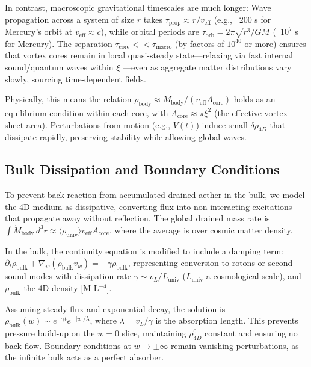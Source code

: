 \documentclass{article}
\begin{document}
In contrast, macroscopic gravitational timescales are much longer: Wave propagation across a system of size $r$ takes $\tau_{\text{prop}} \approx r / v_{\text{eff}}$ (e.g., ~200 s for Mercury's orbit at $v_{\text{eff}} \approx c$), while orbital periods are $\tau_{\text{orb}} = 2\pi \sqrt{r^3 / G M}$ (~$10^{7}$ s for Mercury). The separation $\tau_{\text{core}} << \tau_{\text{macro}}$ (by factors of $10^{40}$ or more) ensures that vortex cores remain in local quasi-steady state---relaxing via fast internal sound/quantum waves within $\xi$ ---even as aggregate matter distributions vary slowly, sourcing time-dependent fields.

Physically, this means the relation $\rho_{\text{body}} \approx \dot{M}_{\text{body}} / (v_{\text{eff}} A_{\text{core}})$ holds as an equilibrium condition within each core, with $A_{\text{core}} \approx \pi \xi^2$ (the effective vortex sheet area). Perturbations from motion (e.g., $V(t)$) induce small $\delta \rho_{4D}$ that dissipate rapidly, preserving stability while allowing global waves.

\subsection{Bulk Dissipation and Boundary Conditions}

To prevent back-reaction from accumulated drained aether in the bulk, we model the 4D medium as dissipative, converting flux into non-interacting excitations that propagate away without reflection. The global drained mass rate is $\int \dot{M}_{\text{body}} \, d^3 r \approx \langle \rho_{\text{univ}} \rangle v_{\text{eff}} A_{\text{core}}$, where the average is over cosmic matter density.

In the bulk, the continuity equation is modified to include a damping term: $\partial_t \rho_{\text{bulk}} + \nabla_w (\rho_{\text{bulk}} v_w) = -\gamma \rho_{\text{bulk}}$, representing conversion to rotons or second-sound modes with dissipation rate $\gamma \sim v_L / L_{\text{univ}}$ ($L_{\text{univ}}$ a cosmological scale), and $\rho_{\text{bulk}}$ the 4D density [M L$^{-4}$].

Assuming steady flux and exponential decay, the solution is $\rho_{\text{bulk}}(w) \sim e^{-\gamma t} e^{-|w| / \lambda}$, where $\lambda = v_L / \gamma$ is the absorption length. This prevents pressure build-up on the $w=0$ slice, maintaining $\rho_{4D}^0$ constant and ensuring no back-flow. Boundary conditions at $w \to \pm \infty$ remain vanishing perturbations, as the infinite bulk acts as a perfect absorber.
\end{document}
